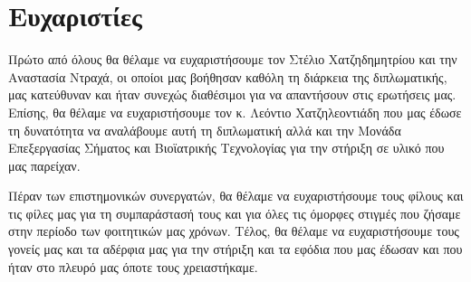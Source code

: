 \section*{Ευχαριστίες}
{}

Πρώτο από όλους θα θέλαμε να ευχαριστήσουμε τον Στέλιο Χατζηδημητρίου και την Αναστασία Ντραχά, οι οποίοι μας βοήθησαν καθόλη τη διάρκεια της διπλωματικής, μας κατεύθυναν και ήταν συνεχώς διαθέσιμοι για να απαντήσουν στις ερωτήσεις μας. Επίσης, θα θέλαμε να ευχαριστήσουμε τον κ. Λεόντιο Χατζηλεοντιάδη που μας έδωσε τη δυνατότητα να αναλάβουμε αυτή τη διπλωματική αλλά και την Μονάδα Επεξεργασίας Σήματος και Βιοϊατρικής Τεχνολογίας για την στήριξη σε υλικό που μας παρείχαν.

Πέραν των επιστημονικών συνεργατών, θα θέλαμε να ευχαριστήσουμε τους φίλους και τις φίλες μας για τη συμπαράστασή τους και για όλες τις όμορφες στιγμές που ζήσαμε στην περίοδο των φοιτητικών μας χρόνων. Τέλος, θα θέλαμε να ευχαριστήσουμε τους γονείς μας και τα αδέρφια μας για την στήριξη και τα εφόδια που μας έδωσαν και που ήταν στο πλευρό μας όποτε τους χρειαστήκαμε.